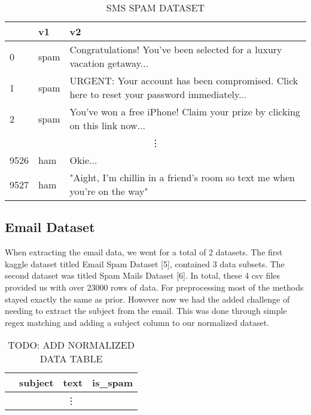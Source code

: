 \documentclass{article}
\begin{document}
\begin{table}[htbp]
    \centering
    \caption{SMS SPAM DATASET}
    \begin{tabular}{lll}
    \toprule
     & v1 & v2 \\
    \midrule
    0 & spam & Congratulations! You've been selected for a luxury vacation getaway... \\
    1 & spam & URGENT: Your account has been compromised. Click here to reset your password immediately... \\
    2 & spam & You've won a free iPhone! Claim your prize by clicking on this link now... \\
    \multicolumn{3}{c}{\vdots} \\ %
    9526 & ham & Okie... \\
    9527 & ham & "Aight, I'm chillin in a friend's room so text me when you're on the way" \\
    \bottomrule
    \end{tabular}
    \label{tab:csv_sample}
\end{table}

\subsection*{Email Dataset}

When extracting the email data, we went for a total of 2 datasets. The first kaggle dataset titled Email Spam Dataset [5], contained 3 data subsets. The second dataset was titled Spam Mails Dataset [6]. In total, these 4 csv files provided us with over 23000 rows of data. 
\newline
\newline
\noindent
For preprocessing most of the methods stayed exactly the same as prior. However now we had the added challenge of needing to extract the subject from the email. This was done through simple regex matching and adding a subject column to our normalized dataset. 

\begin{table}[htbp]
    \centering
    \caption{TODO: ADD NORMALIZED DATA TABLE}
    \begin{tabular}{llll}
    \toprule
     & subject & text & is\_spam \\
    \midrule
    \multicolumn{4}{c}{\vdots} \\ %
    \bottomrule
    \end{tabular}
    \label{tab:csv_sample}
\end{table}
\end{document}
